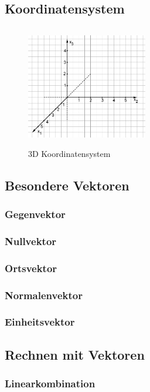 \documentclass[a4paper]{article} %
\begin{document}
	\subsection{Koordinatensystem}
	\begin{minipage}{0.5\textwidth}
			\begin{figure}[H]
				\includegraphics[width=200px, height=200px]{koordinatensystem.png}
					\captionsetup{labelformat=empty}
				\caption{3D Koordinatensystem}
			\end{figure}
		\end{minipage} 
	\subsection{Besondere Vektoren}
	\subsubsection{Gegenvektor}
	\subsubsection{Nullvektor}
	\subsubsection{Ortsvektor}
	\subsubsection{Normalenvektor}
	\subsubsection{Einheitsvektor}
	\subsection{Rechnen mit Vektoren}
	\subsubsection{Linearkombination}
\end{document}
